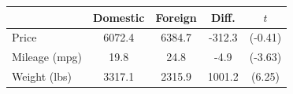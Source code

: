 \begin{tabular}{l*{4}{c}}
\doublerule
                & Domestic&  Foreign&    Diff.         &      $t$\\
\midrule
Price           &   6072.4&   6384.7&   -312.3         &  (-0.41)\\
Mileage (mpg)   &     19.8&     24.8&     -4.9\sym{***}&  (-3.63)\\
Weight (lbs)    &   3317.1&   2315.9&   1001.2\sym{***}&   (6.25)\\
\midrule
\end{tabular}
